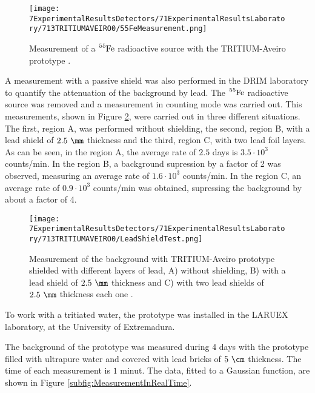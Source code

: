 \begin{figure}[h]
\centering
\texttt{[image: 7ExperimentalResultsDetectors/71ExperimentalResultsLaboratory/713TRITIUMAVEIRO0/55FeMeasurement.png]}
\caption{Measurement of a $\ce{^{55}Fe}$ radioactive source with the TRITIUM-Aveiro prototype \cite{ExperimentalPaperCarlos}.\label{fig:55FeMeasurement}}
\end{figure}

A measurement with a passive shield was also performed in the DRIM laboratory to quantify the attenuation of the background by lead. The $\ce{^{55}Fe}$ radioactive source was removed and a measurement in counting mode was carried out. This measurements, shown in Figure \ref{fig:LeadShieldTest}, were carried out in three different situations. The first, region A, was performed without shielding, the second, region B, with a lead shield of $2.5~\mm$ thickness and the third, region C, with two lead foil layers. As can be seen, in the region A, the average rate of $2.5$ days is $3.5 \cdot{} 10^3$ counts/min. In the region B, a background supression by a factor of 2 was observed, measuring an average rate of $1.6 \cdot{} 10^3$ counts/min. In the region C, an average rate of $0.9 \cdot{} 10^3$ counts/min was obtained, supressing the background by about a factor of 4.

\begin{figure}[h]
\centering
\texttt{[image: 7ExperimentalResultsDetectors/71ExperimentalResultsLaboratory/713TRITIUMAVEIRO0/LeadShieldTest.png]}
\caption{Measurement of the background with TRITIUM-Aveiro prototype shielded with different layers of lead, A) without shielding, B) with a lead shield of $2.5~\mm$ thickness and C) with two lead shields of $2.5~\mm$ thickness each one \cite{ExperimentalPaperCarlos}.\label{fig:LeadShieldTest}}
\end{figure}


To work with a tritiated water, the prototype was installed in the LARUEX laboratory, at the University of Extremadura. 

The background of the prototype was measured during 4 days with the prototype filled with ultrapure water and covered with lead bricks of $5~\cm$ thickness. The time of each measurement is $1$ minut. The data, fitted to a Gaussian function, are shown in Figure \ref{subfig:MeasurementInRealTime}. 

